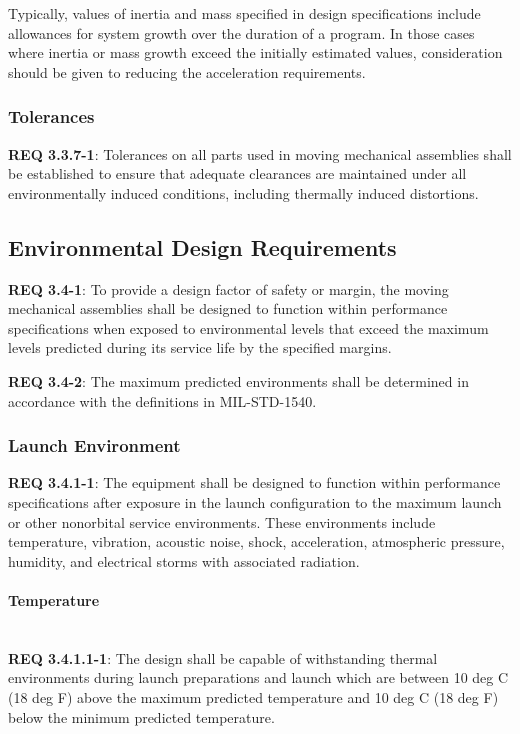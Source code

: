 \documentclass[12pt]{article}
\begin{document}
Typically, values of inertia and mass specified in design specifications include allowances for system growth over the duration of a program. 
In those cases where inertia or mass growth exceed the initially estimated values, consideration should be given to reducing the acceleration requirements.


\subsubsection{Tolerances} %
\noindent \textbf{REQ 3.3.7-1}: Tolerances on all parts used in moving mechanical assemblies shall be established to ensure that adequate clearances are maintained under all environmentally induced conditions, including thermally induced distortions.


\clearpage
\subsection{Environmental Design Requirements} %
\noindent \textbf{REQ 3.4-1}: To provide a design factor of safety or margin, the moving mechanical assemblies shall be designed to function within performance specifications when exposed to environmental levels that exceed the maximum levels predicted during its service life by the specified margins. 

\noindent \textbf{REQ 3.4-2}: The maximum predicted environments shall be determined in accordance with the definitions in MIL-STD-1540.


\subsubsection{Launch Environment} %
\noindent \textbf{REQ 3.4.1-1}: The equipment shall be designed to function within performance specifications after exposure in the launch configuration to the maximum launch or other nonorbital service environments. 
These environments include temperature, vibration, acoustic noise, shock, acceleration, atmospheric pressure, humidity, and electrical storms with associated radiation.


\paragraph{Temperature} \mbox{} \\ %
\noindent \textbf{REQ 3.4.1.1-1}: The design shall be capable of withstanding thermal environments during launch preparations and launch which are between 10 deg C (18 deg F) above the maximum predicted temperature and 10 deg C (18 deg F) below the minimum predicted temperature.
\end{document}
